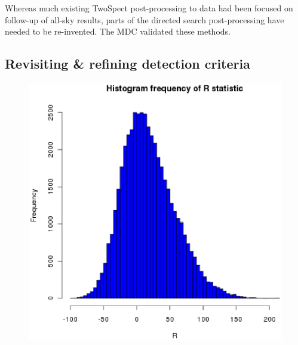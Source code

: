 Whereas much existing TwoSpect post-processing to data had been focused on follow-up of all-sky results, parts of the directed search post-processing have needed to be re-invented.
The MDC validated these methods.


\subsection{Revisiting \& refining detection criteria}


\begin{figure}
\begin{center}
\includegraphics[width=0.6\paperwidth,height=0.35\paperheight]{StatHistRH1.eps}

\end{center}
\end{figure}
